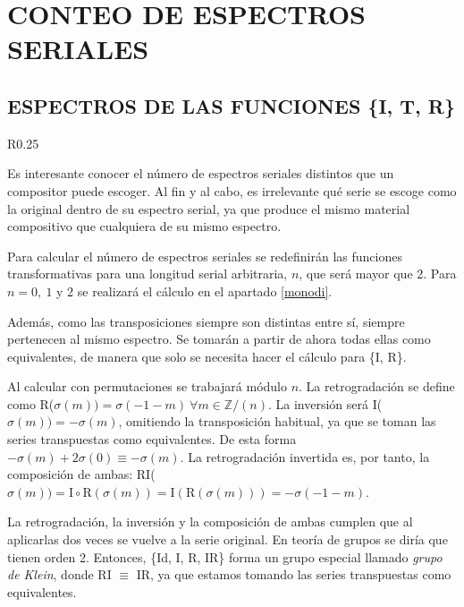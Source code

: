 	\chapter{CONTEO DE ESPECTROS SERIALES}
	\section{ESPECTROS DE LAS FUNCIONES \{I, T, R\}}
		\label{espec}		
		
		\begin{wrapfigure}{R}{0.25\textwidth}
			\captionsetup{justification=centering, font=footnotesize}
			\vspace{-0.5cm}
			
		\end{wrapfigure}
		Es interesante conocer el número de espectros seriales distintos que un compositor puede escoger. Al fin y al cabo, es irrelevante qué serie se escoge como la original dentro de su espectro serial, ya que produce el mismo material compositivo que cualquiera de su mismo espectro.
		
		Para calcular el número de espectros seriales se redefinirán las funciones transformativas para una longitud serial arbitraria, $n$, que será mayor que 2. Para $n=0,\ 1$ y 2 se realizará el cálculo en el apartado \ref{monodi}. 
	
		Además, como las transposiciones siempre son distintas entre sí, siempre pertenecen al mismo espectro. Se tomarán a partir de ahora todas ellas como equivalentes, de manera que solo se necesita hacer el cálculo para \{I, R\}.
		
		Al calcular con permutaciones se trabajará módulo $n$. La retrogradación se define como R($\sigma(m))=\sigma(-1-m)\ \forall m\in \mathbb{Z} / (n)$. La inversión será I($\sigma(m))=-\sigma(m)$, omitiendo la transposición habitual, ya que se toman las series transpuestas como equivalentes. De esta forma $-\sigma(m)+2\sigma(0)\equiv-\sigma(m)$. La retrogradación invertida es, por tanto, la composición de ambas: RI($\sigma(m))=\text{I}\circ\text{R}(\sigma(m))=\text{I}\left(\text{R}(\sigma(m))\right)=-\sigma(-1-m)$.
		
		La retrogradación, la inversión y la composición de ambas cumplen que al aplicarlas dos veces se vuelve a la serie original. En teoría de grupos se diría que tienen orden 2. Entonces, \{Id, I, R, IR\} forma un grupo especial llamado \textit{grupo de Klein}, donde RI $\equiv$ IR, ya que estamos tomando las series transpuestas como equivalentes. 
		
